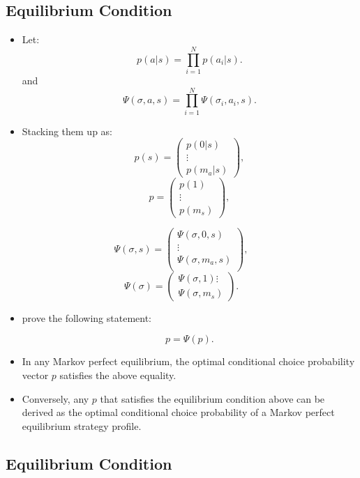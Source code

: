 \documentclass[]{book}
\providecommand{\tightlist}{%
  \setlength{\itemsep}{0pt}\setlength{\parskip}{0pt}}
\begin{document}
\subsection{Equilibrium Condition}\label{equilibrium-condition-1}

\begin{itemize}
\tightlist
\item
  Let: \[
  p(a|s) = \prod_{i = 1}^N p(a_i|s).
  \] and \[
  \Psi(\sigma, a, s) = \prod_{i = 1}^N \Psi(\sigma_i, a_i, s).
  \]
\item
  Stacking them up as: \[
  p(s) = 
  \begin{pmatrix}
  p(0|s) \\
  \vdots \\
  p(m_a|s)
  \end{pmatrix},
  \] \[
  p = 
  \begin{pmatrix}
  p(1)\\
  \vdots\\
  p(m_s)
  \end{pmatrix},
  \]
\end{itemize}

\[
\Psi(\sigma, s) = 
\begin{pmatrix}
\Psi(\sigma, 0, s) \\
\vdots \\
\Psi(\sigma, m_a, s) \\
\end{pmatrix},
\] \[
\Psi(\sigma) = 
\begin{pmatrix}
\Psi(\sigma, 1)
\vdots\\
\Psi(\sigma, m_s)
\end{pmatrix}.
\]

\begin{itemize}
\tightlist
\item
  \citet{pesendorferAsymptoticLeastSquares2008} prove the following
  statement:

  \begin{equation}
  p = \Psi(p).
  \end{equation}
\item
  In any Markov perfect equilibrium, the optimal conditional choice
  probability vector \(p\) satisfies the above equality.
\item
  Conversely, any \(p\) that satisfies the equilibrium condition above
  can be derived as the optimal conditional choice probability of a
  Markov perfect equilibrium strategy profile.
\end{itemize}

\subsection{Equilibrium Condition}\label{equilibrium-condition-2}
\end{document}
